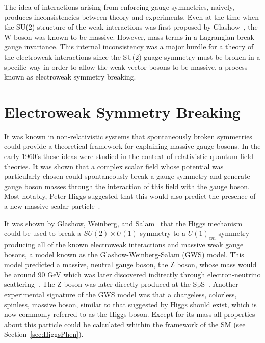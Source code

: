 The idea of interactions arising from enforcing gauge symmetries, 
naively,
produces inconsistencies between theory and experiments.  Even at 
the time when the SU(2) structure of the weak interactions was first
proposed by Glashow~\cite{Glashow:1961}, the W boson was known 
to be massive.  
However, mass terms in a Lagrangian break gauge
invariance.  This internal inconsistency was a major hurdle for 
a theory of the electroweak interactions since 
the SU(2) guage symmetry must be broken in a specific way in order
to allow the weak vector bosons to be massive, a process known
as electroweak symmetry breaking.  

\section{Electroweak Symmetry Breaking}
\label{sec:Electroweak Symmetry Breaking}

It was known in non-relativistic systems that spontaneously broken symmetries
could provide a theoretical framework for explaining massive gauge 
bosons\cite{Anderson:1963pc}. In the early 1960's these ideas were studied in the context
of relativistic quantum field theories.  It was shown that a complex 
scalar field whose potential was particularly chosen could spontaneously 
break a gauge symmetry and generate gauge boson masses through the 
interaction of this field with the gauge 
boson\cite{Higgs:1964,Englert:1964,Higgs:1964-2,Guralnik:1964}.  Most notably, 
Peter Higgs suggested that this would also predict the presence of a new 
massive scalar particle~\cite{Higgs:1964-2}.

It was shown by Glashow, Weinberg, and Salam~\cite{Glashow:1961,Weinberg:1967,Salam:1968} 
that the Higgs mechanism 
could be used to break a $SU(2)\times U(1)$ symmetry to a $U(1)_{em}$
symmetry producing all of the known electroweak interactions and massive 
weak gauge bosons, a model known as the Glashow-Weinberg-Salam (GWS) model.
This model predicted a massive, neutral gauge boson, the Z boson,
whose mass would be around 90 GeV which was later discovered
indirectly through electron-neutrino 
scattering~\cite{Hasert:1973,Hasert:1973-2,Hasert:1974}.  
The Z boson was later directly produced at the SpS~\cite{??}.
Another experimental signature of the GWS model was that a chargeless,
colorless, spinless, massive boson, similar to that suggested by Higgs should
exist, which is now commonly referred to as the Higgs boson.
Except for its mass all properties about this particle could be calculated
whithin the framework of the SM (see Section~\ref{sec:HiggsPhen}).  

